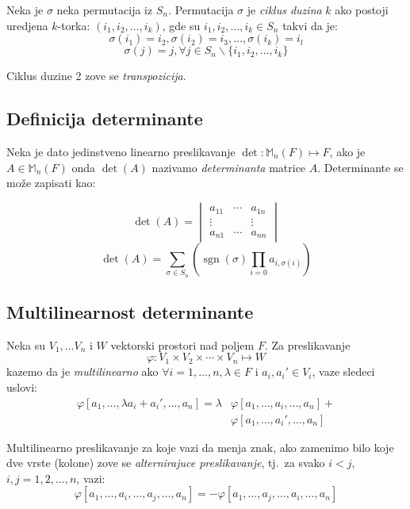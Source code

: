 \documentclass[12p,a4paper]{article}
\DeclareMathOperator{\sgn}{sgn}
\begin{document}
\begin{multicols}{2}
    Neka je $\sigma$ neka permutacija iz $S_n$. Permutacija $\sigma$ je 
    \textit{ciklus duzina} $k$ ako postoji uredjena $k$-torka:
    $(i_1, i_2, \ldots, i_k)$, gde su $i_1, i_2, \ldots, i_k \in S_n$ 
    takvi da je:
    \[\sigma(i_1) = i_2, \sigma(i_2) = i_3, \ldots, \sigma(i_k) = i_l\]
    \[\sigma(j) = j, \forall j \in S_n \backslash \{i_1, i_2, \ldots, i_k\}\]
    
    Ciklus duzine 2 zove se \textit{transpozicija}.

\subsection{Definicija determinante}

    Neka je dato jedinstveno linearno preslikavanje 
    $\det : \mathbb{M}_n (F) \mapsto F$, ako je $A \in \mathbb{M}_n(F)$ onda 
    $\det(A)$ nazivamo \textit{determinanta} matrice $A$. Determinante se 
    može zapisati kao:

    \[
        \det(A) = 
        \begin{vmatrix}
            a_{11} & \cdots & a_{1n} \\
            \vdots & &        \vdots \\
            a_{n1} & \cdots & a_{nn} 
        \end{vmatrix}
    \]
    \[ 
        \det(A) = \sum_{\sigma \in S_n} 
        \left( 
        \sgn(\sigma) \prod_{i=0} a_{i,\sigma(i)} 
        \right) 
    \]

\subsection{Multilinearnost determinante}

    Neka su $V_1, \ldots V_n$ i $W$ vektorski prostori nad poljem $F$. 
    Za preslikavanje 
    \[\varphi : V_1 \times V_2 \times \cdots \times V_n \mapsto W\]
    kazemo da je \textit{multilinearno} ako $\forall i=1,\ldots,n, 
    \lambda \in F$ i $a_i, a_i' \in V_i$,
    vaze sledeci uslovi:
    \begin{align*}
        \varphi [ a_1, \ldots, \lambda a_i + a_i', \ldots, a_n ] = 
        \lambda & \varphi [ a_1, \ldots, a_i, \ldots, a_n ] + \\
        &\varphi [ a_1, \ldots, a_i', \ldots, a_n ]
    \end{align*}

    Multilinearno preslikavanje za koje vazi da menja znak, ako 
    zamenimo bilo koje dve vrste (kolone) zove se 
    \textit{alternirajuce preslikavanje}, tj.\ za svako 
    $i < j$, $i, j = 1, 2, \ldots, n$, vazi:
    \[
        \varphi [ a_1, \ldots, a_i, \ldots, a_j, \ldots, a_n ] =
        - \varphi [ a_1, \ldots, a_j, \ldots, a_i, \ldots, a_n ]
    \]


\end{multicols}
\end{document}
